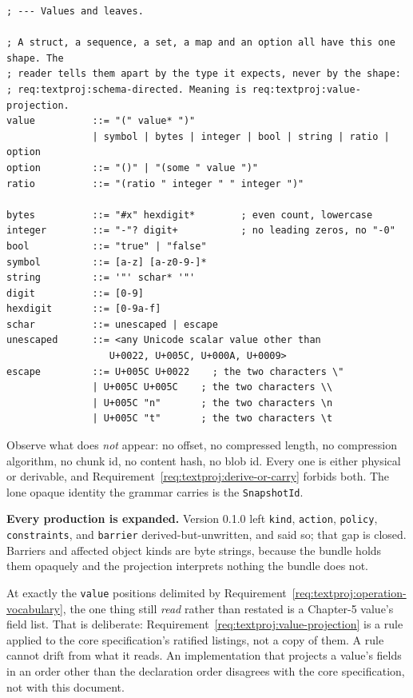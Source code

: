 \documentclass[11pt,letterpaper]{report}
\begin{document}
\begin{lstlisting}
; --- Values and leaves.

; A struct, a sequence, a set, a map and an option all have this one shape. The
; reader tells them apart by the type it expects, never by the shape:
; req:textproj:schema-directed. Meaning is req:textproj:value-projection.
value          ::= "(" value* ")"
               | symbol | bytes | integer | bool | string | ratio | option
option         ::= "()" | "(some " value ")"
ratio          ::= "(ratio " integer " " integer ")"

bytes          ::= "#x" hexdigit*        ; even count, lowercase
integer        ::= "-"? digit+           ; no leading zeros, no "-0"
bool           ::= "true" | "false"
symbol         ::= [a-z] [a-z0-9-]*
string         ::= '"' schar* '"'
digit          ::= [0-9]
hexdigit       ::= [0-9a-f]
schar          ::= unescaped | escape
unescaped      ::= <any Unicode scalar value other than
                  U+0022, U+005C, U+000A, U+0009>
escape         ::= U+005C U+0022    ; the two characters \"
               | U+005C U+005C    ; the two characters \\
               | U+005C "n"       ; the two characters \n
               | U+005C "t"       ; the two characters \t
\end{lstlisting}

Observe what does \emph{not} appear: no offset, no compressed length, no
compression algorithm, no chunk id, no content hash, no blob id. Every one is
either physical or derivable, and
Requirement~\ref{req:textproj:derive-or-carry} forbids both. The lone opaque
identity the grammar carries is the \texttt{SnapshotId}.

\textbf{Every production is expanded.} Version 0.1.0 left \texttt{kind},
\texttt{action}, \texttt{policy}, \texttt{constraints}, and \texttt{barrier}
derived-but-unwritten, and said so; that gap is closed. Barriers and affected
object kinds are byte strings, because the bundle holds them opaquely and the
projection interprets nothing the bundle does not.

At exactly the \texttt{value} positions delimited by
Requirement~\ref{req:textproj:operation-vocabulary}, the one thing still
\emph{read} rather than restated is a Chapter-5 value's field list. That is
deliberate: Requirement~\ref{req:textproj:value-projection} is a rule applied to
the core specification's ratified listings, not a copy of them.
A rule cannot drift from what it reads. An implementation that projects a value's
fields in an order other than the declaration order disagrees with the core
specification, not with this document.
\end{document}
